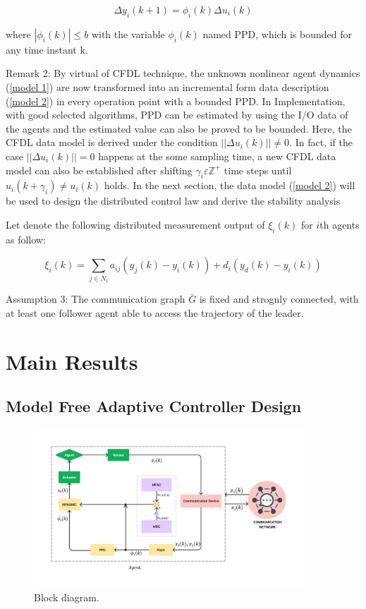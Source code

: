 \documentclass[journal,onecolumn]{IEEEtran}
\begin{document}
\begin{equation}
    \label{model 2}
    \Delta y_i(k+1)=\phi_i(k)\Delta u_i(k)
\end{equation}

where \( | \phi_i(k) | \leq b\) with the variable \(\phi_i(k)\) named PPD, which is bounded for any time instant k.

Remark 2: By virtual of CFDL technique, the unknown nonlinear agent dynamics (\ref{model 1}) are now transformed into an incremental form data description (\ref{model 2}) in every operation point with a bounded PPD. In Implementation, with good selected algorithms, PPD can be estimated by using the I/O data of the agents and the estimated value can also be proved to be bounded. Here, the CFDL data model is derived under the condition $ ||\Delta u_i(k) || \neq 0 $. In fact, if the case $ ||\Delta u_i(k) || = 0 $ happens at the some sampling time, a new CFDL data model can also be established after shifting $ \gamma_i \varepsilon \mathbb{Z}^+ $  time steps until $ u_i(k+\gamma_i) \neq u_i(k)$ holds. In the next section, the data model (\ref{model 2}) will be used to design the distributed control law and derive the stability analysis
 
Let denote the following distributed measurement output of \(\xi_i(k)\) for $i$th agents as follow:

\begin{equation}
    \label{model 3}
    \xi_i(k) = \sum_{j \in N_i} a_{ij}( y_j(k)-y_i(k)) + d_i(y_d(k) - y_i(k ))
\end{equation}

 

Assumption 3: The communication graph $\bar{G}$ is fixed and strognly connected, with at least one follower agent able to access the trajectory of the leader.


\section{Main Results}

\subsection{Model Free Adaptive Controller Design}


\begin{figure}[H]
    \centering
    \includegraphics[width=0.9\textwidth]{diagram.png}
    \caption{Block diagram.}
    \label{fig:diagram} %
\end{figure}
\end{document}
